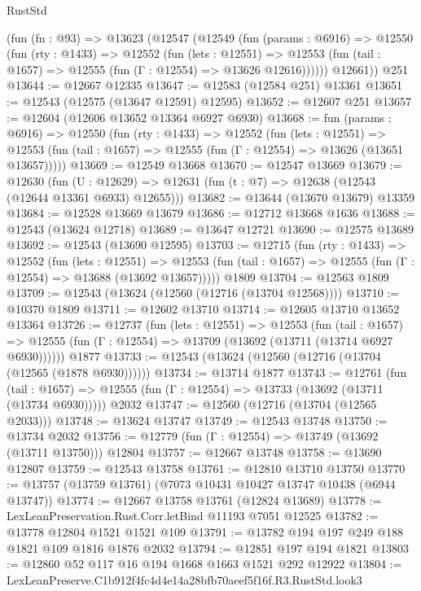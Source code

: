 \begin{lexlean}{RustStd}
\begin{coremodule}
    (fun (fn : @93) =>
    @13623
      (@12547
        (@12549
          (fun (params : @6916) =>
          @12550
            (fun (rty : @1433) =>
            @12552
              (fun (lets : @12551) =>
              @12553 (fun (tail : @1657) => @12555 (fun (Γ : @12554) => @13626 @12616))))))
        @12661))
    @251
@13644 := @12667 @12335
@13647 := @12583 (@12584 @251) @13361
@13651 := @12543 (@12575 (@13647 @12591) @12595)
@13652 := @12607 @251
@13657 := @12604 (@12606 @13652 @13364 @6927 @6930)
@13668 := fun (params : @6916) =>
  @12550
    (fun (rty : @1433) =>
    @12552
      (fun (lets : @12551) =>
      @12553 (fun (tail : @1657) => @12555 (fun (Γ : @12554) => @13626 (@13651 @13657)))))
@13669 := @12549 @13668
@13670 := @12547 @13669
@13679 := @12630
    (fun (U : @12629) => @12631 (fun (t : @7) => @12638 (@12543 (@12644 @13361 @6933) @12655)))
@13682 := @13644 (@13670 @13679) @13359
@13684 := @12528 @13669 @13679
@13686 := @12712 @13668 @1636
@13688 := @12543 (@13624 @12718)
@13689 := @13647 @12721
@13690 := @12575 @13689
@13692 := @12543 (@13690 @12595)
@13703 := @12715
    (fun (rty : @1433) =>
    @12552
      (fun (lets : @12551) =>
      @12553 (fun (tail : @1657) => @12555 (fun (Γ : @12554) => @13688 (@13692 @13657)))))
    @1809
@13704 := @12563 @1809
@13709 := @12543 (@13624 (@12560 (@12716 (@13704 @12568))))
@13710 := @10370 @1809
@13711 := @12602 @13710
@13714 := @12605 @13710 @13652 @13364
@13726 := @12737
    (fun (lets : @12551) =>
    @12553
      (fun (tail : @1657) =>
      @12555 (fun (Γ : @12554) => @13709 (@13692 (@13711 (@13714 @6927 @6930))))))
    @1877
@13733 := @12543 (@13624 (@12560 (@12716 (@13704 (@12565 (@1878 @6930))))))
@13734 := @13714 @1877
@13743 := @12761
    (fun (tail : @1657) => @12555 (fun (Γ : @12554) => @13733 (@13692 (@13711 (@13734 @6930)))))
    @2032
@13747 := @12560 (@12716 (@13704 (@12565 @2033)))
@13748 := @13624 @13747
@13749 := @12543 @13748
@13750 := @13734 @2032
@13756 := @12779 (fun (Γ : @12554) => @13749 (@13692 (@13711 @13750))) @12804
@13757 := @12667 @13748
@13758 := @13690 @12807
@13759 := @12543 @13758
@13761 := @12810 @13710 @13750
@13770 := @13757 (@13759 @13761) (@7073 @10431 @10427 @13747 @10438 (@6944 @13747))
@13774 := @12667 @13758 @13761 (@12824 @13689)
@13778 := LexLeanPreservation.Rust.Corr.letBind @11193 @7051 @12525
@13782 := @13778 @12804 @1521 @1521 @109
@13791 := @13782 @194 @197 @249 @188 @1821 @109 @1816 @1876 @2032
@13794 := @12851 @197 @194 @1821
@13803 := @12860 @52 @117 @16 @194 @1668 @1663 @1521 @292 @12922
@13804 := LexLeanPreserve.C1b912f4fc4d4e14a28bfb70aeef5f16f.R3.RustStd.look3

\end{coremodule}
\end{lexlean}
